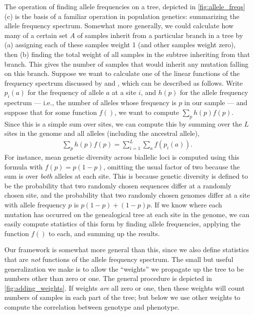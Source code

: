 \documentclass[9pt,twoside,lineno]{gsajnl}
\begin{document}
The operation of finding allele frequencies on a tree,
depicted in \autoref{fig:allele_freqs}(c)
is the basis of a familiar operation in population genetics:
summarizing the allele frequency spectrum.
Somewhat more generally, we could calculate how many of a certain set $A$ of samples
inherit from a particular branch in a tree
by (a) assigning each of these samples weight 1 (and other samples weight zero), then
(b) finding the total weight of all samples in the subtree inheriting from that branch.
This gives the number of samples that would inherit any mutation falling on this branch.
Suppose we want to calculate one of the linear functions of the frequency spectrum
discussed by \citet{fu1995statistical} and \citet{achaz2009frequency},
which can be described as follows.
Write $p_i(a)$ for the frequency of allele $a$ at a site $i$,
and $h(p)$ for the allele frequency spectrum
--- i.e., the number of alleles whose frequency is $p$ in our sample ---
and suppose that for some function $f()$, we want to compute $\sum_p h(p) f(p)$.
Since this is a simple sum over sites,
we can compute this by summing over the $L$ sites in the genome and all alleles
(including the ancestral allele),
\begin{align*}
    \sum_p h(p) f(p) = \sum_{i=1}^L \sum_a f(p_i(a)).
\end{align*}
For instance, mean genetic diversity across biallelic loci is computed using this formula
with $f(p) = p (1-p)$,
omitting the usual factor of two because the sum is over \emph{both} alleles at each site.
This is because genetic diversity is defined to be the probability that two randomly chosen sequences
differ at a randomly chosen site,
and the probability that two randomly chosen genomes differ at a site with allele frequency $p$
is $p (1-p) + (1-p) p$.
If we know where each mutation has occurred on the genealogical tree at each site in the genome,
we can easily compute statistics of this form
by finding allele frequencies, applying the function $f( )$ to each,
and summing up the results.

Our framework is somewhat more general than this, since we also define statistics that are
\emph{not} functions of the allele frequency spectrum.
The small but useful generalization we make is to allow the ``weights'' we propagate up the tree
to be numbers other than zero or one.
The general procedure is depicted in \autoref{fig:adding_weights}.
If weights \emph{are} all zero or one, then these weights will count numbers of samples
in each part of the tree;
but below we use other weights to compute the correlation between genotype and phenotype.
\end{document}
